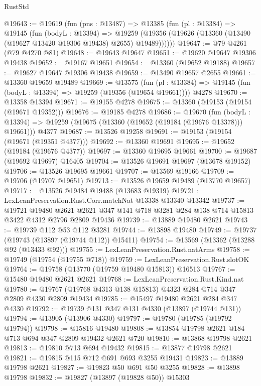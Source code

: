 \begin{lexlean}{RustStd}
\begin{coremodule}
@19643 := @19619
    (fun (pns : @13487) =>
    @13385
      (fun (pl : @13384) =>
      @19145
        (fun (bodyL : @13394) =>
        @19259 (@19356 (@19626 (@13360 (@13490 (@19627 @13420 @19306 @19438) @2655) @19489))))))
@19647 := @79 @4261 (@79 @4270 @81)
@19648 := @19643 @19647
@19651 := @19620 @19647 @19306 @19438
@19652 := @19167 @19651
@19654 := @13360 (@19652 @19188)
@19657 := @19627 @19647 @19306 @19438
@19659 := @13490 @19657 @2655
@19661 := @13360 @19659 @19489
@19669 := @13575
    (fun (pl : @13384) => @19145 (fun (bodyL : @13394) => @19259 (@19356 (@19654 @19661))))
    @4278
@19670 := @13358 @13394
@19671 := @19155 @4278
@19675 := @13360 (@19153 (@19154 (@19671 @19352)))
@19676 := @19185 @4278
@19686 := @19670
    (fun (bodyL : @13394) => @19259 (@19675 (@13360 (@19652 (@19184 (@19676 @13378))) @19661)))
    @4377
@19687 := @13526 @19258
@19691 := @19153 (@19154 (@19671 (@19351 @4377)))
@19692 := @13360 @19691
@19695 := @19652 (@19184 (@19676 @4377))
@19697 := @13360 @19695 @19661
@19700 := @19687 (@19692 @19697) @16405
@19704 := @13526 @19691 @19697 (@13678 @19152)
@19706 := @13526 @19695 @19661
@19707 := @13569 @19166
@19709 := @19706 (@19707 @19651)
@19713 := @13526 @19659 @19489 (@13770 @19657)
@19717 := @13526 @19484 @19488 (@13683 @19319)
@19721 := LexLeanPreservation.Rust.Corr.matchNat @13338 @13340 @13342
@19737 := @19721
    @19480
    @2621
    @2621
    @347
    @141
    @718
    @3281
    @284
    @138
    @714
    @15813
    @3422
    @4312
    @2796
    @2809
    @19436
@19739 := @13889 @19480 @2621
@19743 := @19739 @112 @53 @112 @3281
@19744 := @13898 @19480
@19749 := @19737 (@19743 (@13897 (@19744 @112)) @15411)
@19754 := @13569 (@13362 (@13288 @92 (@13433 @92)))
@19755 := LexLeanPreservation.Rust.natArms
@19758 := @19749 (@19754 (@19755 @718))
@19759 := LexLeanPreservation.Rust.slotOK
@19764 := @19758 (@13770 (@19759 @19480 @15813)) @16513
@19767 := @15480 @19480 @2621 @2621
@19768 := LexLeanPreservation.Rust.Kind.nat
@19780 := @19767 (@19768 @4313 @138 @15813) @4323 @284 @714 @347 @2809 @4330 @2809 @19434
@19785 := @15497 @19480 @2621 @284 @347 @4330
@19792 := @19739 @131 @347 @131 @4330 (@13897 (@19744 @131))
@19794 := @13905 (@13906 @4330)
@19797 := @19780 (@19785 (@19792 @19794))
@19798 := @15816 @19480
@19808 := @13854 @19798 @2621 @184 @713 @694 @347 @2809 @19432 @2621 @720
@19810 := @13868 @19798 @2621
@19813 := @19810 @713 @694 @19432
@19815 := @13877 @19798 @2621
@19821 := @19815 @115 @712 @691 @693 @3255 @19431
@19823 := @13889 @19798 @2621
@19827 := @19823 @50 @691 @50 @3255
@19828 := @13898 @19798
@19832 := @19827 (@13897 (@19828 @50)) @15303

\end{coremodule}
\end{lexlean}
